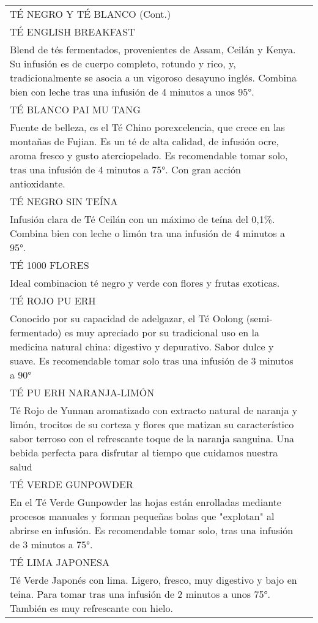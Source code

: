 \documentclass[12pt a5paper]{article}
\makeatletter
\newcommand*\ColText[1]{\textcolor{Goldenrod3}{#1}}
\newenvironment{Group}[1]
{\noindent\begin{tabular*}{\textwidth}{@{}p{1\linewidth}@{\extracolsep{\fill}}r@{}}
{\fontsize{24}{29}\selectfont\ColText{#1}}
              \\[0.8em]}
              {
\end{tabular*}}
\newcommand*\Entry[1]{%
    \sffamily#1}
\newcommand*\Expl[1]{%
    \hspace*{1em}\footnotesize #1}
\makeatother
\begin{document}
    \begin{Group}{TÉ NEGRO Y TÉ BLANCO (Cont.)}
        \Entry{TÉ ENGLISH BREAKFAST} \\
        \Expl{Blend de tés fermentados, provenientes de Assam, Ceilán y Kenya. Su infusión es de cuerpo completo, rotundo y rico, y, tradicionalmente se asocia a un vigoroso desayuno inglés. Combina bien con leche tras una infusión de 4 minutos a unos 95°.} \\
        \Entry{TÉ BLANCO PAI MU TANG} \\
        \Expl{Fuente de belleza, es el Té Chino porexcelencia, que crece en las montañas de Fujian. Es un té de alta calidad, de infusión ocre, aroma fresco y gusto aterciopelado. Es recomendable tomar solo, tras una infusión de 4 minutos a 75°. Con gran acción antioxidante.} \\
        \Entry{TÉ NEGRO SIN TEÍNA} \\
        \Expl{Infusión clara de Té Ceilán con un máximo de teína del 0,1\%. Combina bien con leche o limón tra una infusión de 4 minutos a 95°.} \\
        \Entry{TÉ 1000 FLORES} \\
        \Expl{Ideal combinacion té negro y verde con flores y frutas exoticas.} \\
        \Entry{TÉ ROJO PU ERH} \\
        \Expl{Conocido por su capacidad de adelgazar, el Té Oolong (semi-fermentado) es muy apreciado por su tradicional uso en la medicina natural china: digestivo y depurativo. Sabor dulce y suave. Es recomendable tomar solo tras una infusión de 3 minutos a 90°} \\
        \Entry{TÉ PU ERH NARANJA-LIMÓN} \\
        \Expl{Té Rojo de Yunnan aromatizado con extracto natural de naranja y limón, trocitos de su corteza y flores que matizan su característico sabor terroso con el refrescante toque de la naranja sanguina. Una bebida perfecta para disfrutar al tiempo que cuidamos nuestra salud} \\
        \Entry{TÉ VERDE GUNPOWDER} \\
        \Expl{En el Té Verde Gunpowder las hojas están enrolladas mediante procesos manuales y forman pequeñas bolas que "explotan" al abrirse en infusión. Es recomendable tomar solo, tras una infusión de 3 minutos a 75°.} \\
        \Entry{TÉ LIMA JAPONESA} \\
        \Expl{Té Verde Japonés con lima. Ligero, fresco, muy digestivo y bajo en teina. Para tomar tras una infusión de 2 minutos a unos 75°. También es muy refrescante con hielo.} \\

\end{Group}
\end{document}
